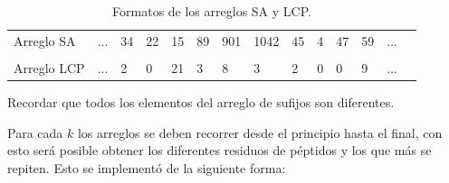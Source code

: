 \begin{table}[h]
\centering
\label{my-label15}
\begin{tabular}{llllllllllllll}
\cline{2-13}
\multicolumn{1}{l|}{Arreglo SA}  & \multicolumn{1}{l|}{...} & \multicolumn{1}{l|}{34} & \multicolumn{1}{l|}{22} & \multicolumn{1}{l|}{15} & \multicolumn{1}{l|}{89} & \multicolumn{1}{l|}{901} & \multicolumn{1}{l|}{1042} & \multicolumn{1}{l|}{45} & \multicolumn{1}{l|}{4} & \multicolumn{1}{l|}{47} & \multicolumn{1}{l|}{59} & \multicolumn{1}{l|}{...} &  \\ \cline{2-13}
                                 &                          &                         &                         &                         &                         &                          &                           &                         &                        &                         &                         &                          &  \\ \cline{2-13}
\multicolumn{1}{l|}{Arreglo LCP} & \multicolumn{1}{l|}{...} & \multicolumn{1}{l|}{2}  & \multicolumn{1}{l|}{0}  & \multicolumn{1}{l|}{21} & \multicolumn{1}{l|}{3}  & \multicolumn{1}{l|}{8}   & \multicolumn{1}{l|}{3}    & \multicolumn{1}{l|}{2}  & \multicolumn{1}{l|}{0} & \multicolumn{1}{l|}{0}  & \multicolumn{1}{l|}{9}  & \multicolumn{1}{l|}{...} &  \\ \cline{2-13}
\end{tabular}
\caption{Formatos de los arreglos SA y LCP.}
\end{table}

Recordar que todos los elementos del arreglo de sufijos son diferentes.

Para cada $k$ los arreglos se deben recorrer desde el principio hasta el final, con esto será posible obtener los diferentes residuos de péptidos y los que más se repiten. Esto se implementó de la siguiente forma:

